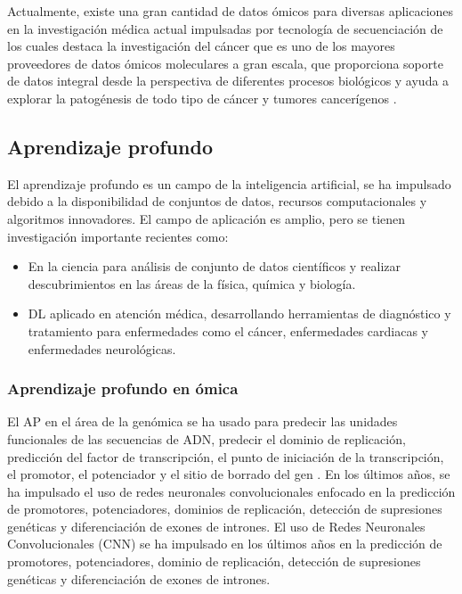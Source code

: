 Actualmente, existe una gran cantidad de datos ómicos para diversas aplicaciones en la investigación médica actual impulsadas por tecnología de secuenciación de los cuales destaca la investigación del cáncer que es uno de los mayores proveedores de datos ómicos moleculares a gran escala, que proporciona soporte de datos integral desde la perspectiva de diferentes procesos biológicos y ayuda a explorar la patogénesis de todo tipo de cáncer y tumores cancerígenos \citep{li2024avbae}.

\subsection{Aprendizaje profundo}

El aprendizaje profundo es un campo de la inteligencia artificial, se ha impulsado debido a la disponibilidad de conjuntos de datos, recursos computacionales y algoritmos innovadores. El campo de aplicación es amplio, pero se tienen investigación importante recientes como:

\begin{itemize}

   \addtolength{\itemsep}{-4mm} %
        \item En la ciencia para análisis de conjunto de datos científicos y realizar descubrimientos en las áreas de la física, química y biología.

        \item DL aplicado en atención médica, desarrollando herramientas de diagnóstico y tratamiento para enfermedades como el cáncer, enfermedades cardiacas y enfermedades neurológicas.

    \end{itemize}

\subsubsection{Aprendizaje profundo en ómica}

El AP en el área de la genómica se ha usado para predecir las unidades funcionales de las secuencias de ADN, predecir el dominio de replicación, predicción del factor de transcripción, el punto de iniciación de la transcripción, el promotor, el potenciador y el sitio de borrado del gen \citep{quang2019factornet,umarov2017recognition,zeng2016convolutional,zhang2017titer,min2017predicting,singh2019predicting,lee2015dna}. En los últimos años, se ha impulsado el uso de redes neuronales convolucionales enfocado en la predicción de promotores, potenciadores, dominios de replicación, detección de supresiones genéticas y diferenciación de exones de intrones. El uso de Redes Neuronales Convolucionales (CNN) se ha impulsado en los últimos años en la predicción de promotores, potenciadores, dominio de replicación, detección de supresiones genéticas y diferenciación de exones de intrones.

